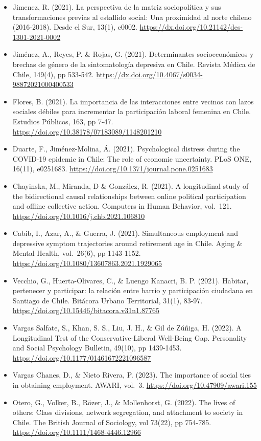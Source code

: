 \documentclass[
  12pt,
]{article}
\begin{document}
\begin{itemize}
\item
  Jimenez, R. (2021). La perspectiva de la matriz sociopolítica y sus transformaciones previas al estallido social: Una proximidad al norte chileno (2016-2018). Desde el Sur, 13(1), e0002. \url{https://dx.doi.org/10.21142/des-1301-2021-0002}
\item
  Jiménez, A., Reyes, P. \& Rojas, G. (2021). Determinantes socioeconómicos y brechas de género de la sintomatología depresiva en Chile. Revista Médica de Chile, 149(4), pp 533-542. \url{https://dx.doi.org/10.4067/s0034-98872021000400533}
\item
  Flores, B. (2021). La importancia de las interacciones entre vecinos con lazos sociales débiles para incrementar la participación laboral femenina en Chile. Estudios Públicos, 163, pp 7-47. \url{https://doi.org/10.38178/07183089/1148201210}
\item
  Duarte, F., Jiménez-Molina, Á. (2021). Psychological distress during the COVID-19 epidemic in Chile: The role of economic uncertainty. PLoS ONE, 16(11), e0251683. \url{https://doi.org/10.1371/journal.pone.0251683}
\item
  Chayinska, M., Miranda, D \& González, R. (2021). A longitudinal study of the bidirectional causal relationships between online political participation and offline collective action. Computers in Human Behavior, vol.~121. \url{https://doi.org/10.1016/j.chb.2021.106810}
\item
  Cabib, I., Azar, A., \& Guerra, J. (2021). Simultaneous employment and depressive symptom trajectories around retirement age in Chile. Aging \& Mental Health, vol.~26(6), pp 1143-1152. \url{https://doi.org/10.1080/13607863.2021.1929065}
\item
  Vecchio, G., Huerta-Olivares, C., \& Luengo Kanacri, B. P. (2021). Habitar, pertenecer y participar: la relación entre barrio y participación ciudadana en Santiago de Chile. Bitácora Urbano Territorial, 31(1), 83-97. \url{https://doi.org/10.15446/bitacora.v31n1.87765}
\item
  Vargas Salfate, S., Khan, S. S., Liu, J. H., \& Gil de Zúñiga, H. (2022). A Longitudinal Test of the Conservative-Liberal Well-Being Gap. Personality and Social Psychology Bulletin, 49(10), pp 1439-1453. \url{https://doi.org/10.1177/01461672221096587}
\item
  Vargas Chanes, D., \& Nieto Rivera, P. (2023). The importance of social ties in obtaining employment. AWARI, vol.~3. \url{https://doi.org/10.47909/awari.155}
\item
  Otero, G., Volker, B., Rözer, J., \& Mollenhorst, G. (2022). The lives of others: Class divisions, network segregation, and attachment to society in Chile. The British Journal of Sociology, vol 73(22), pp 754-785. \url{https://doi.org/10.1111/1468-4446.12966}

\end{itemize}
\end{document}
